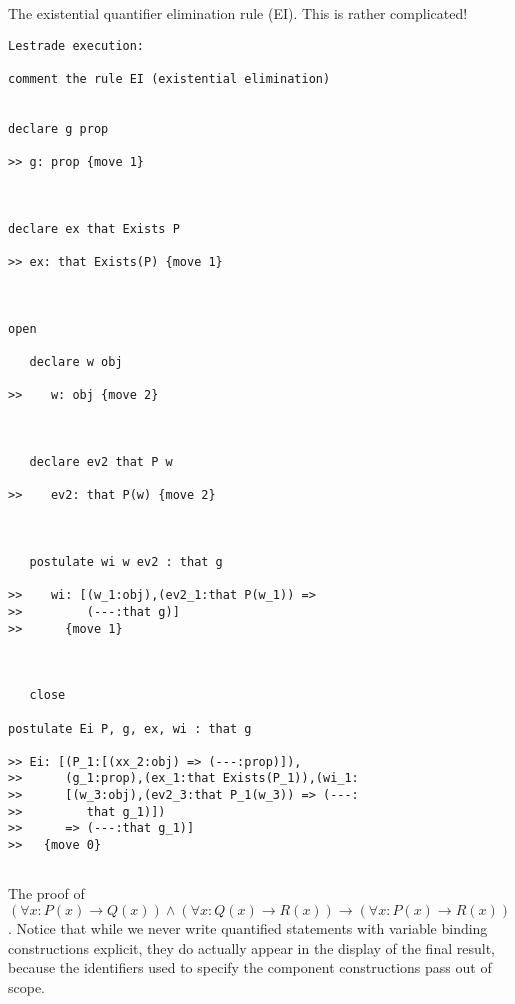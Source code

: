 \documentclass[12pt]{article}
\begin{document}
The existential quantifier elimination rule (EI).  This is rather complicated!

\begin{verbatim}Lestrade execution:

comment the rule EI (existential elimination)


declare g prop

>> g: prop {move 1}



declare ex that Exists P

>> ex: that Exists(P) {move 1}



open

   declare w obj

>>    w: obj {move 2}



   declare ev2 that P w

>>    ev2: that P(w) {move 2}



   postulate wi w ev2 : that g

>>    wi: [(w_1:obj),(ev2_1:that P(w_1)) =>
>>         (---:that g)]
>>      {move 1}



   close

postulate Ei P, g, ex, wi : that g

>> Ei: [(P_1:[(xx_2:obj) => (---:prop)]),
>>      (g_1:prop),(ex_1:that Exists(P_1)),(wi_1:
>>      [(w_3:obj),(ev2_3:that P_1(w_3)) => (---:
>>         that g_1)])
>>      => (---:that g_1)]
>>   {move 0}


\end{verbatim}

The proof of $(\forall x:P(x) \rightarrow Q(x)) \wedge (\forall x:Q(x) \rightarrow R(x)) \rightarrow (\forall x:P(x) \rightarrow R(x))$.  Notice that while we never write
quantified statements with  variable binding constructions explicit, they do actually appear in the display of the final result, because the identifiers used to specify the component constructions  pass out of scope.
\end{document}
